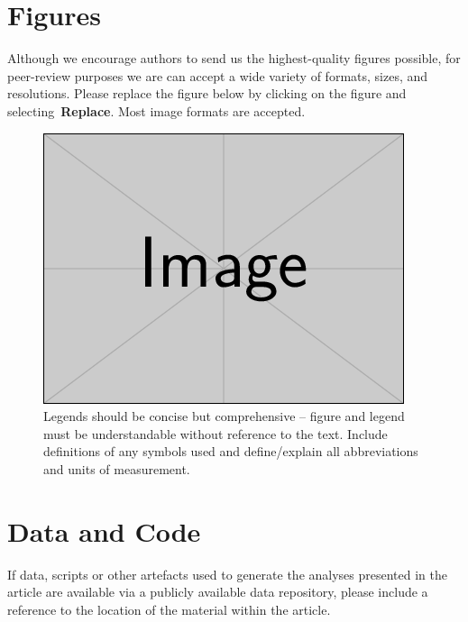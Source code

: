 \documentclass[alpha-refs]{wiley-article}
\begin{document}
\section*{Figures}

{\label{537325}}

Although we encourage authors to send us the highest-quality figures
possible, for peer-review purposes we are can accept a wide variety of
formats, sizes, and resolutions. Please replace the figure below by
clicking on the figure and selecting~\textbf{Replace}. Most image
formats are accepted.
\begin{figure}[h!]
\begin{center}
\includegraphics[width=0.70\columnwidth]{figures/example-image-rectangle/example-image-rectangle}
\caption{{Legends should be concise but comprehensive -- figure and legend must be
understandable without reference to the text. Include definitions of any
symbols used and define/explain all abbreviations and units of
measurement.
{\label{div-126281}}%
}}
\end{center}
\end{figure}

\par\null

\section*{\texorpdfstring{{Data and
Code}}{Data and Code}}

{\label{182566}}

{}{If data, scripts or other artefacts used to generate the analyses
presented in the article are available via a publicly available data
repository, please include a reference to the location of the material
within the article.}

\par\null
\end{document}
